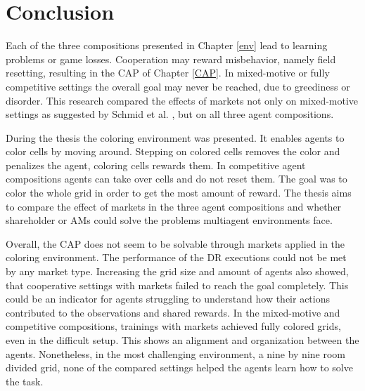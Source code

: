 %
%
\chapter{Conclusion}\label{sec:Conclusion}

Each of the three compositions presented in Chapter \ref{env} lead to learning problems or game losses. Cooperation may reward misbehavior, namely field resetting, resulting in the CAP of Chapter \ref{CAP}. In mixed-motive or fully competitive settings the overall goal may never be reached, due to greediness or disorder. This research compared the effects of markets not only on mixed-motive settings as suggested by Schmid et al. \cite{scbe21}, but on all three agent compositions.

During the thesis the coloring environment was presented. It enables agents to color cells by moving around. Stepping on colored cells removes the color and penalizes the agent, coloring cells rewards them. In competitive agent compositions agents can take over cells and do not reset them. The goal was to color the whole grid in order to get the most amount of reward. The thesis aims to compare the effect of markets in the three agent compositions and whether shareholder or AMs could solve the problems multiagent environments face.

Overall, the CAP does not seem to be solvable through markets applied in the coloring environment. The performance of the DR executions could not be met by any market type. Increasing the grid size and amount of agents also showed, that cooperative settings with markets failed to reach the goal completely. This could be an indicator for agents struggling to understand how their actions contributed to the observations and shared rewards. In the mixed-motive and competitive compositions, trainings with markets achieved fully colored grids, even in the difficult setup. This shows an alignment and organization between the agents. Nonetheless, in the most challenging environment, a nine by nine room divided grid, none of the compared settings helped the agents learn how to solve the task.

